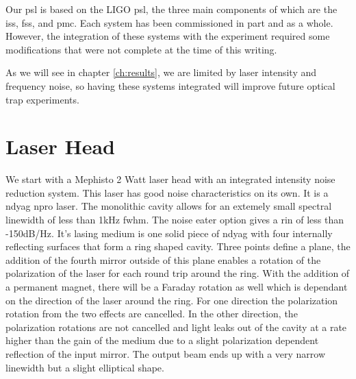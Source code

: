 Our \ac{psl} is based on the LIGO \ac{psl}, the three main components of which
are the \ac{iss}, \ac{fss}, and \ac{pmc}. Each system has been commissioned in
part and as a whole. However, the integration of these systems with the
experiment required some modifications that were not complete at the time of
this writing.

As we will see in chapter \ref{ch:results}, we are limited by laser intensity
and frequency noise, so having these systems integrated will improve
future optical trap experiments.


\section{Laser Head}

We start with a Mephisto 2 Watt laser head with an integrated intensity
noise reduction system.
This laser has good noise characteristics on its own.
It is a \ac{ndyag} \ac{npro} laser. The monolithic cavity allows for an
extemely small spectral linewidth of less than 1kHz \ac{fwhm}. The noise
eater option gives a \ac{rin} of less than -150dB/Hz.
It's lasing medium is one solid piece of \ac{ndyag} with four internally
reflecting surfaces that form a ring shaped cavity.
Three points define a plane, the addition of the fourth mirror outside of this
plane enables a rotation of the polarization of the laser for each round trip
around the ring.
With the addition of a permanent magnet, there will be a Faraday rotation as
well which is dependant on the direction of the laser around the ring.
For one direction the polarization rotation from the two effects are cancelled.
In the other direction, the polarization rotations are not cancelled and light
leaks out of the cavity at a rate higher than the gain of the medium due to a
slight polarization dependent reflection of the input mirror.
The output beam ends up with a very narrow linewidth but a slight elliptical
shape.


